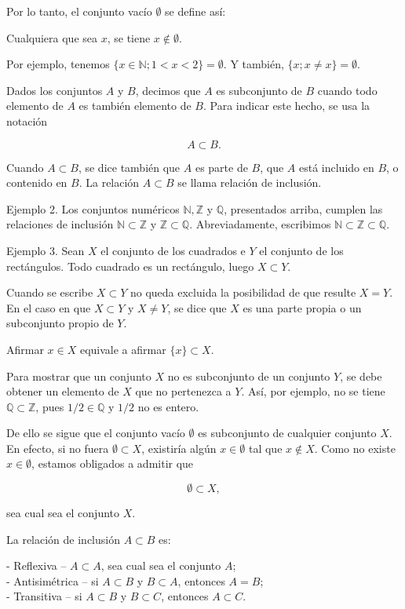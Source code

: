 Por lo tanto, el conjunto vacío \(\emptyset\) se define así:

Cualquiera que sea \(x\), se tiene \(x \notin \emptyset\).

Por ejemplo, tenemos \(\{x \in \mathbb{N}; 1 < x < 2\} = \emptyset\). Y también, \(\{x; x \neq x\} = \emptyset\).

Dados los conjuntos \(A\) y \(B\), decimos que \(A\) es subconjunto de \(B\) cuando todo elemento de \(A\) es también elemento de \(B\). Para indicar este hecho, se usa la notación

\[A \subset B.\]

Cuando \(A \subset B\), se dice también que \(A\) es parte de \(B\), que \(A\) está incluido en \(B\), o contenido en \(B\). La relación \(A \subset B\) se llama relación de inclusión.

Ejemplo 2. Los conjuntos numéricos \(\mathbb{N}, \mathbb{Z}\) y \(\mathbb{Q}\), presentados arriba, cumplen las relaciones de inclusión \(\mathbb{N} \subset \mathbb{Z}\) y \(\mathbb{Z} \subset \mathbb{Q}\). Abreviadamente, escribimos \(\mathbb{N} \subset \mathbb{Z} \subset \mathbb{Q}\).

Ejemplo 3. Sean \(X\) el conjunto de los cuadrados e \(Y\) el conjunto de los rectángulos. Todo cuadrado es un rectángulo, luego \(X \subset Y\).

Cuando se escribe \(X \subset Y\) no queda excluida la posibilidad de que resulte \(X = Y\). En el caso en que \(X \subset Y\) y \(X \neq Y\), se dice que \(X\) es una parte propia o un subconjunto propio de \(Y\).

Afirmar \(x \in X\) equivale a afirmar \(\{x\} \subset X\).

Para mostrar que un conjunto \(X\) no es subconjunto de un conjunto \(Y\), se debe obtener un elemento de \(X\) que no pertenezca a \(Y\). Así, por ejemplo, no se tiene \(\mathbb{Q} \subset \mathbb{Z}\), pues \(1/2 \in \mathbb{Q}\) y \(1/2\) no es entero.

De ello se sigue que el conjunto vacío \(\emptyset\) es subconjunto de cualquier conjunto \(X\). En efecto, si no fuera \(\emptyset \subset X\), existiría algún \(x \in \emptyset\) tal que \(x \notin X\). Como no existe \(x \in \emptyset\), estamos obligados a admitir que

\[\emptyset \subset X,\]

sea cual sea el conjunto \(X\).

La relación de inclusión \(A \subset B\) es:

- Reflexiva – \(A \subset A\), sea cual sea el conjunto \(A\);\\
- Antisimétrica – si \(A \subset B\) y \(B \subset A\), entonces \(A = B\);\\
- Transitiva – si \(A \subset B\) y \(B \subset C\), entonces \(A \subset C\).

